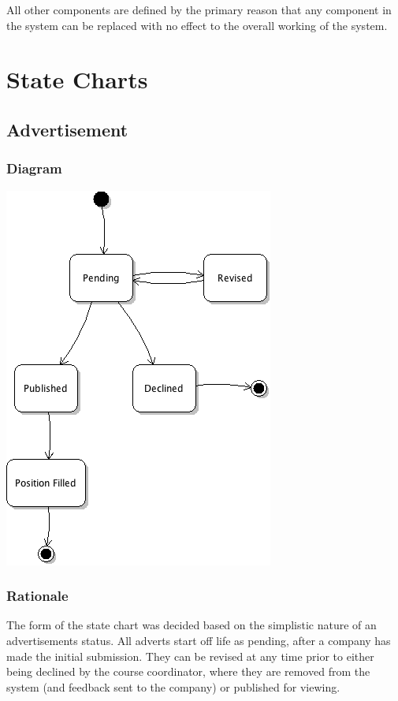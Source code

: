 \documentclass[11pt]{article}
\begin{document}
All other components are defined by the primary reason that any component in the 
system can be replaced with no effect to the overall working of the system.

\newpage

\section{State Charts}

\subsection{Advertisement}

\subsubsection{Diagram}

\includegraphics{advertState.png}

\subsubsection{Rationale}

The form of the state chart was decided based on the simplistic nature of an 
advertisements status. All adverts start off life as pending, after a company
has made the initial submission. They can be revised at any time prior to either
being declined by the course coordinator, where they are removed from the system
(and feedback sent to the company) or published for viewing.
\end{document}
